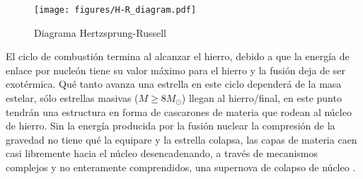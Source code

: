 \begin{figure}[H]
    \centering
    \texttt{[image: figures/H-R\_diagram.pdf]}%
    \caption{Diagrama Hertzsprung-Russell}
    \label{HR}
\end{figure}




El ciclo de combustión termina al alcanzar el hierro, debido a que la energía de enlace por nucleón tiene su valor máximo para el hierro y la fusión deja de ser exotérmica. Qué tanto avanza una estrella en este ciclo dependerá de la masa estelar, sólo estrellas masivas ($M \geq 8 M_{\odot} $) llegan al hierro/final, en este punto tendrán una estructura en forma de cascarones de materia que rodean al núcleo de hierro. Sin la energía producida por la fusión nuclear la compresión de la gravedad no tiene qué la equipare y la estrella colapsa, las capas de materia caen casi libremente hacia el núcleo desencadenando, a través de mecanismos complejos y no enteramente comprendidos, una supernova de colapso de núcleo \cite{Woosley2005TheSupernovae} \cite{Janka2012ExplosionSupernovae}.   

